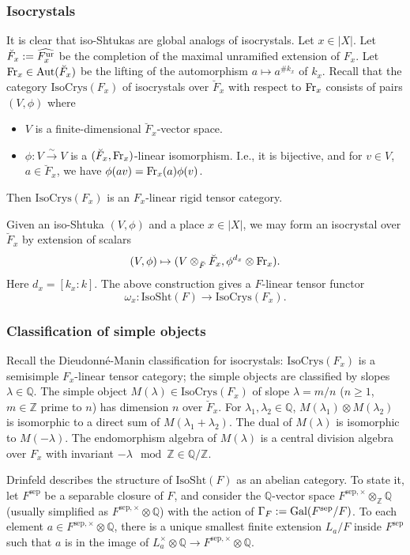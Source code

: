 \documentclass[11pt]{amsart}
\numberwithin{equation}{section}
\theoremstyle{plain}
\theoremstyle{definition}
\def\QQ{\mathbb{Q}}
\def\ZZ{\mathbb{Z}}
\newcommand\Fr{\textup{Fr}}
\newcommand\Gal{\textup{Gal}}
\newcommand{\ur}{\textup{ur}}
\newcommand\Aut{\textup{Aut}}
\newcommand{\isom}{\stackrel{\sim}{\to}}
\newcommand{\wh}[1]{\widehat{#1}}
\newcommand\sss{\subsubsection}
\newcommand\ot{\otimes}
\newcommand\G\Gamma
\renewcommand\d\delta
\renewcommand{\l}{\lambda}
\newcommand{\om}{\omega}
\newcommand{\br}{\breve}
\newcommand{\IsoSht}{\mathrm{IsoSht}}
\newcommand{\IsoCrys}{\mathrm{IsoCrys}}
\newcommand{\sep}{\mathrm{sep}}
\begin{document}
\sss{Isocrystals} It is clear that iso-Shtukas are global analogs of isocrystals. Let $x\in |X|$. Let $\br F_{x}:=\wh{F_{x}^{\ur}}$ be the completion of the maximal unramified extension of $F_{x}$. Let $\Fr_{x}\in\Aut(\br F_{x})$ be the lifting of the automorphism $a\mapsto a^{\# k_{x}}$ of $k_{x}$. Recall that the category $\IsoCrys(F_{x})$ of isocrystals over $\br F_{x}$ with respect to $\Fr_{x}$ consists of pairs $(V, \phi)$ where 
\begin{itemize}
\item $V$ is a finite-dimensional $\br F_{x}$-vector space.
\item $\phi: V\isom V$ is a $(\br F_{x}, \Fr_{x})$-linear isomorphism. I.e., it is bijective, and for $v\in V$,  $a\in \br F_{x}$, we have 
$\phi(av)=\Fr_{x}(a)\phi(v)$.
\end{itemize}
Then $\IsoCrys(F_{x})$ is an $F_{x}$-linear rigid tensor category. 

Given an iso-Shtuka $(V,\phi)$ and a place $x\in|X|$, we may form an isocrystal over $\br F_{x}$ by extension of scalars
\begin{equation*}
(V,\phi)\mapsto (V\ot_{\br F}\br F_{x}, \phi^{d_{x}}\ot \Fr_{x}).
\end{equation*}
Here $d_{x}=[k_{x}:k]$. The above construction gives a $F$-linear tensor functor
\begin{equation}\label{Sht fib functor}
\om_{x}: \IsoSht(F)\to \IsoCrys(F_{x}).
\end{equation}

\sss{Classification of simple objects}
Recall the Dieudonn\'e-Manin classification for isocrystals: $\IsoCrys(F_{x})$ is a semisimple $F_{x}$-linear tensor category; the simple objects are classified by slopes $\l\in \QQ$. The simple object $M(\l)\in \IsoCrys(F_{x})$ of slope $\l=m/n$ ($n\ge1$, $m\in \ZZ$ prime to $n$) has dimension $n$ over $\br F_{x}$. For $\l_{1}, \l_{2}\in \QQ$, $M(\l_{1})\ot M(\l_{2})$ is isomorphic to a direct sum of $M(\l_{1}+\l_{2})$. The dual of $M(\l)$ is isomorphic to $M(-\l)$. The endomorphism algebra of $M(\l)$ is a central division algebra over $F_{x}$ with invariant $-\l\mod\ZZ\in \QQ/\ZZ$.


Drinfeld \cite[\S2]{Dr-Pet} describes the structure of $\IsoSht(F)$ as an abelian category. To state it, let $F^{\sep}$ be a separable closure of $F$, and consider the $\QQ$-vector space $F^{\sep,\times}\ot_{\ZZ}\QQ$ (usually simplified as $F^{\sep,\times}\ot\QQ$) with the action of $\G_{F}:=\Gal(F^{\sep}/F)$. To each element  $a\in F^{\sep,\times}\ot\QQ$, there is a unique smallest finite extension $L_{a}/F$ inside $F^{\sep}$ such that $a$ is in the image of $L^{\times}_{a}\ot\QQ\to F^{\sep,\times }\ot\QQ$.  %
\end{document}
